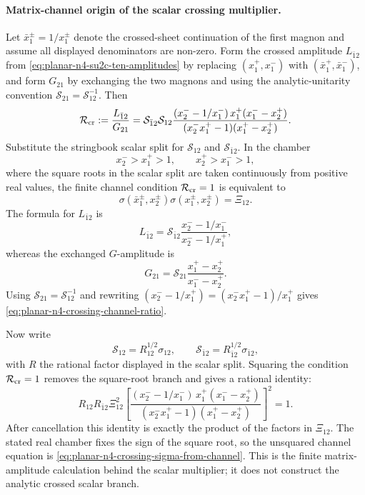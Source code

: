 \paragraph{Matrix-channel origin of the scalar crossing multiplier.}
Let \(\bar x_1^\pm=1/x_1^\pm\) denote the crossed-sheet continuation of the
first magnon and assume all displayed denominators are non-zero.  Form the
crossed amplitude \(L_{\bar1 2}\) from
\eqref{eq:planar-n4-su2c-ten-amplitudes} by replacing
\((x_1^+,x_1^-)\) with \((\bar x_1^+,\bar x_1^-)\), and form \(G_{21}\) by
exchanging the two magnons and using the analytic-unitarity convention
\(\mathcal S_{21}=\mathcal S_{12}^{-1}\).  Then
\begin{equation}
  \mathcal R_{\rm cr}
  :=
  \frac{L_{\bar1 2}}{G_{21}}
  =
  \mathcal S_{\bar1 2}\mathcal S_{12}
  \frac{(x_2^- -1/x_1^-)\,x_1^+(x_1^- -x_2^+)}
       {(x_2^-x_1^+-1)(x_1^+ -x_2^+)} .
  \label{eq:planar-n4-crossing-channel-ratio}
\end{equation}
Substitute the stringbook scalar split for
\(\mathcal S_{12}\) and \(\mathcal S_{\bar1 2}\).  In the chamber
\[
  x_2^->x_1^+>1,\qquad x_2^+>x_1^->1,
\]
where the square roots in the scalar split are taken continuously from
positive real values, the finite channel condition
\(\mathcal R_{\rm cr}=1\) is equivalent to
\begin{equation}
  \sigma(\bar x_1^\pm,x_2^\pm)\sigma(x_1^\pm,x_2^\pm)=\Xi_{12}.
  \label{eq:planar-n4-crossing-sigma-from-channel}
\end{equation}
The formula for \(L_{\bar1 2}\) is
\[
  L_{\bar1 2}
  =
  \mathcal S_{\bar1 2}
  \frac{x_2^- -1/x_1^-}{x_2^- -1/x_1^+},
\]
whereas the exchanged \(G\)-amplitude is
\[
  G_{21}
  =
  \mathcal S_{21}
  \frac{x_1^+ -x_2^+}{x_1^- -x_2^+}.
\]
Using \(\mathcal S_{21}=\mathcal S_{12}^{-1}\) and rewriting
\((x_2^- -1/x_1^+)=(x_2^-x_1^+-1)/x_1^+\) gives
\eqref{eq:planar-n4-crossing-channel-ratio}.

Now write
\[
  \mathcal S_{12}=R_{12}^{1/2}\sigma_{12},
  \qquad
  \mathcal S_{\bar1 2}=R_{\bar1 2}^{1/2}\sigma_{\bar1 2},
\]
with \(R\) the rational factor displayed in the scalar split.  Squaring the
condition \(\mathcal R_{\rm cr}=1\) removes the square-root branch and gives
a rational identity:
\[
  R_{12}R_{\bar1 2}\Xi_{12}^{2}
  \left[
    \frac{(x_2^- -1/x_1^-)\,x_1^+(x_1^- -x_2^+)}
         {(x_2^-x_1^+-1)(x_1^+ -x_2^+)}
  \right]^2
  =1 .
\]
After cancellation this identity is exactly the product of the factors in
\(\Xi_{12}\).  The stated real chamber fixes the sign of the square root, so
the unsquared channel equation is
\eqref{eq:planar-n4-crossing-sigma-from-channel}.  This is the finite
matrix-amplitude calculation behind the scalar multiplier; it does not
construct the analytic crossed scalar branch.


